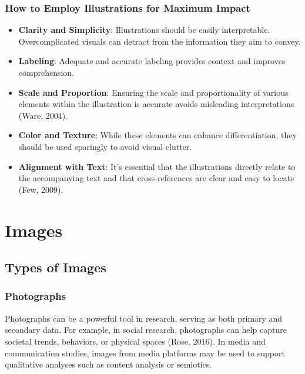 \documentclass[
  b5paper]{book}
\begin{document}
\hypertarget{how-to-employ-illustrations-for-maximum-impact}{%
\subsubsection{How to Employ Illustrations for Maximum Impact}\label{how-to-employ-illustrations-for-maximum-impact}}

\begin{itemize}
\item
  \textbf{Clarity and Simplicity}: Illustrations should be easily interpretable. Overcomplicated visuals can detract from the information they aim to convey.
\item
  \textbf{Labeling}: Adequate and accurate labeling provides context and improves comprehension.
\item
  \textbf{Scale and Proportion}: Ensuring the scale and proportionality of various elements within the illustration is accurate avoids misleading interpretations (Ware, 2004).
\item
  \textbf{Color and Texture}: While these elements can enhance differentiation, they should be used sparingly to avoid visual clutter.
\item
  \textbf{Alignment with Text}: It's essential that the illustrations directly relate to the accompanying text and that cross-references are clear and easy to locate (Few, 2009).
\end{itemize}

\hypertarget{images}{%
\section{Images}\label{images}}

\hypertarget{types-of-images}{%
\subsection{Types of Images}\label{types-of-images}}

\hypertarget{photographs}{%
\subsubsection{Photographs}\label{photographs}}

Photographs can be a powerful tool in research, serving as both primary and secondary data. For example, in social research, photographs can help capture societal trends, behaviors, or physical spaces (Rose, 2016). In media and communication studies, images from media platforms may be used to support qualitative analyses such as content analysis or semiotics.
\end{document}
